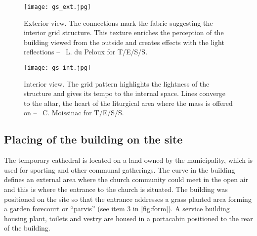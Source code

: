 \begin{figure}[p]
	\captionsetup[subfloat]{captionskip=10pt}
     	\centering
	\begin{fullpage}	
		\texttt{[image: gs\_ext.jpg]}
		\caption{Exterior view. The connections mark the fabric suggesting the interior grid structure. This texture enriches the perception of the building viewed from the outside and creates effects with the light reflections -- \textcopyright~L. du Peloux for T/E/S/S.}
		\label{fig:gs_ext}
		\vspace{1cm}
		\texttt{[image: gs\_int.jpg]}\label{fig:gs_int}
		\caption{Interior view. The grid pattern highlights the lightness of the structure and gives its tempo to the internal space. Lines converge to the altar, the heart of the liturgical area where the mass is offered on -- \textcopyright~C. Moissinac for T/E/S/S.}
		\vspace{20pt}
	\end{fullpage}
\end{figure}


\subsection{Placing of the building on the site}
The temporary cathedral is located on a land owned by the municipality, which is used for sporting and other communal gatherings. The curve in the building defines an external area where the church community could meet in the open air and this is where the entrance to the church is situated. The building was positioned on the site so that the entrance addresses a grass planted area forming a garden forecourt or “parvis” (see item 3 in \cref{fig:form}). A service building housing plant, toilets and vestry are housed in a portacabin positioned to the rear of the building.

